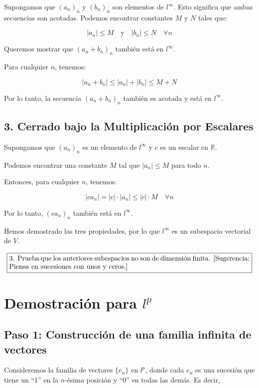 \documentclass{article}
\begin{document}
Supongamos que \( (a_n)_n \) y \( (b_n)_n \) son elementos de \( l^\infty \). Esto significa que ambas secuencias son acotadas. Podemos encontrar constantes \( M \) y \( N \) tales que:

\[
|a_n| \leq M \quad \text{y} \quad |b_n| \leq N \quad \forall n
\]

Queremos mostrar que \( (a_n + b_n)_n \) también está en \( l^\infty \).

Para cualquier \( n \), tenemos:

\[
|a_n + b_n| \leq |a_n| + |b_n| \leq M + N
\]

Por lo tanto, la secuencia \( (a_n + b_n)_n \) también es acotada y está en \( l^\infty \).

\subsection*{3. Cerrado bajo la Multiplicación por Escalares}

Supongamos que \( (a_n)_n \) es un elemento de \( l^\infty \) y \( c \) es un escalar en \( \mathbb{R} \).

Podemos encontrar una constante \( M \) tal que \( |a_n| \leq M \) para todo \( n \).

Entonces, para cualquier \( n \), tenemos:

\[
|c a_n| = |c| \cdot |a_n| \leq |c| \cdot M \quad \forall n
\]

Por lo tanto, \( (c a_n)_n \) también está en \( l^\infty \).

Hemos demostrado las tres propiedades, por lo que \( l^\infty \) es un subespacio vectorial de \( V \).


\[
\boxed{
\begin{minipage}{1\textwidth}
3. Prueba que los anteriores subespacios no son de dimensión finita. 
[Sugerencia: Piensa en sucesiones con unos y ceros.]
\end{minipage}
}
\]


\section*{Demostración para \( l^p \)}

\subsection*{Paso 1: Construcción de una familia infinita de vectores}

Consideremos la familia de vectores \( \{ e_n \} \) en \( l^p \), donde cada \( e_n \) es una sucesión que tiene un ``1'' en la \( n \)-ésima posición y ``0'' en todas las demás. Es decir,
\end{document}
